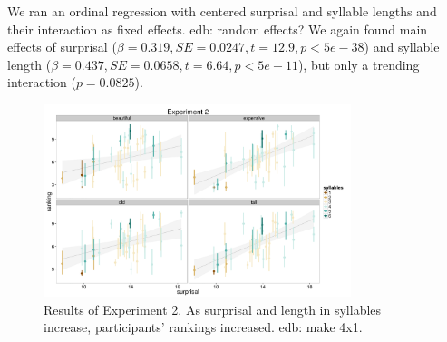 \documentclass[10pt,letterpaper]{article}
\newcommand{\todo}[1]{{\color{red}#1}}
\begin{document}
We ran an ordinal
regression with centered surprisal and syllable lengths and their interaction as fixed effects.
\todo{edb: random effects?}
We again found main effects of surprisal ($\beta=0.319, SE=0.0247, t=12.9, p<5e-38$) and syllable length ($\beta=0.437, SE=0.0658, t=6.64, p<5e-11$), but only a trending interaction ($p=0.0825$).

\begin{figure}[ht]
\begin{center}
\includegraphics[width=0.8\textwidth]{analysis_files_for_writeup/images/exp2-plot.png}
\end{center}
\caption{Results of Experiment 2. As surprisal and length in syllables increase, participants' rankings increased. \todo{edb: make 4x1.}} 
\label{exp2-plot}
\end{figure}
\end{document}
